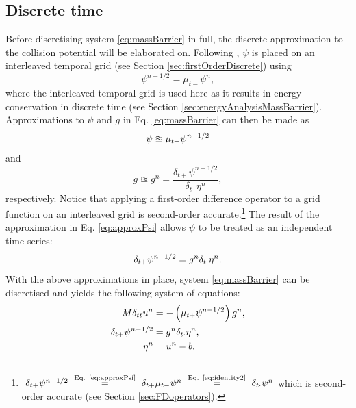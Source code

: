 \subsection{Discrete time}
Before discretising system \eqref{eq:massBarrier} in full, the discrete approximation to the collision potential will be elaborated on.
Following \cite{Ducceschi2021}, $\psi$ is placed on an interleaved temporal grid (see Section \ref{sec:firstOrderDiscrete}) using
\begin{equation}\label{eq:psiHalfDef}
    \psi^{n-1/2} = \mu_{t-}\psi^n,
\end{equation} 
where the interleaved temporal grid is used here as it results in energy conservation in discrete time (see Section \ref{sec:energyAnalysisMassBarrier}). Approximations to $\psi$ and $g$ in Eq. \eqref{eq:massBarrier} can then be made as 
\begin{equation}
    \psi \approxeq \mu_{t+} \psi^{n-1/2}
\end{equation}
and 
\begin{equation}\label{eq:approxPsi}
    g \approxeq g^n = \frac{\delta_{t+}\psi^{n-1/2}}{\delta_{t\cdot}\eta^n} ,
\end{equation}
respectively. Notice that applying a first-order difference operator to a grid function on an interleaved grid is second-order accurate.\footnote{$\ \dtp \psi^{n-1/2}\ \overset{\text{Eq. \eqref{eq:approxPsi}}}{=}\ \dtp \mtm \psi^n\ \overset{\text{Eq. \eqref{eq:identity2}}}{=}\  \dtd \psi^n$ which is second-order accurate (see Section \ref{sec:FDoperators}).}
The result of the approximation in Eq. \eqref{eq:approxPsi} allows $\psi$ to be treated as an independent time series:
\begin{equation}
    \delta_{t+} \psi^{n-1/2} = g^n \delta_{t\cdot} \eta^n.
\end{equation}
With the above approximations in place, system \eqref{eq:massBarrier} can be discretised and yields the following system of equations: 
\begin{subequations}\label{eq:massBarrierSystem}
    \begin{align}
        M\delta_{tt} u^n &= -\left(\mu_{t+}\psi^{n-1/2}\right)g^n,\label{eq:massBarrierSystem1}\\
        \delta_{t+} \psi^{n-1/2} &= g^n \delta_{t\cdot} \eta^n,\label{eq:massBarrierSystem2}\\ 
        \eta^n &= u^n - b.\label{eq:massBarrierSystem3}
    \end{align}
\end{subequations}


